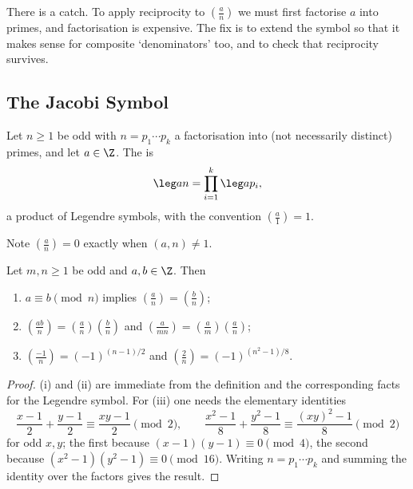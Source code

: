There is a catch. To apply reciprocity to $\left( \frac an \right)$ we must first factorise $a$ into primes, and factorisation is expensive. The fix is to extend the symbol so that it makes sense for composite `denominators' too, and to check that reciprocity survives.

\subsection{The Jacobi Symbol}

\begin{definition}
	Let $n \geq 1$ be odd with $n = p_1 \cdots p_k$ a factorisation into (not necessarily distinct) primes, and let $a \in \Z$. The  is
	$$
	\leg an = \prod_{i=1}^k \leg a{p_i},
	$$
	a product of Legendre symbols, with the convention $\left( \frac a1 \right) = 1$.
\end{definition}

Note $\left( \frac an \right) = 0$ exactly when $(a, n) \neq 1$.

\begin{proposition}\label{prop:jacobi}
	Let $m, n \geq 1$ be odd and $a, b \in \Z$. Then
	\begin{enumerate}[label=(\roman*)]
		\item $a \equiv b \pmod n$ implies $\left( \frac an \right) = \left( \frac bn \right)$;
		\item $\left( \frac{ab}n \right) = \left( \frac an \right)\left( \frac bn \right)$ and $\left( \frac a{mn} \right) = \left( \frac am \right)\left( \frac an \right)$;
		\item $\left( \frac{-1}n \right) = (-1)^{(n-1)/2}$ and $\left( \frac 2n \right) = (-1)^{(n^2 - 1)/8}$.
	\end{enumerate}
\end{proposition}
\begin{proof}
	(i) and (ii) are immediate from the definition and the corresponding facts for the Legendre symbol. For (iii) one needs the elementary identities
	$$
	\frac{x - 1}{2} + \frac{y-1}2 \equiv \frac{xy - 1}{2} \pmod 2, \qquad \frac{x^2 - 1}8 + \frac{y^2 - 1}8 \equiv \frac{(xy)^2 - 1}8 \pmod 2
	$$
	for odd $x, y$; the first because $(x-1)(y-1) \equiv 0 \pmod 4$, the second because $(x^2 - 1)(y^2-1) \equiv 0 \pmod{16}$. Writing $n = p_1 \cdots p_k$ and summing the identity over the factors gives the result.
\end{proof}

